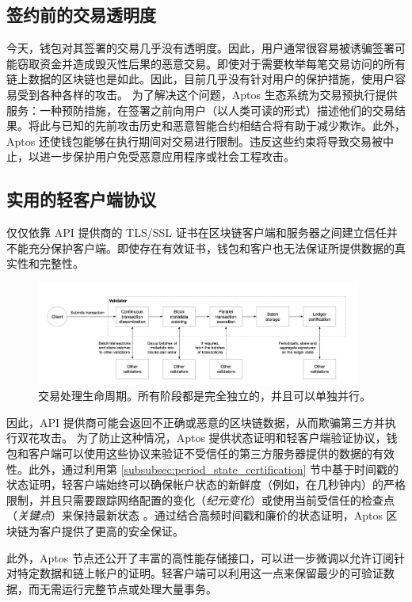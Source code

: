 \documentclass{article}
\begin{document}
\subsection{签约前的交易透明度}

今天，钱包对其签署的交易几乎没有透明度。因此，用户通常很容易被诱骗签署可能窃取资金并造成毁灭性后果的恶意交易。即使对于需要枚举每笔交易访问的所有链上数据的区块链也是如此。因此，目前几乎没有针对用户的保护措施，使用户容易受到各种各样的攻击。 为了解决这个问题，Aptos 生态系统为交易预执行提供服务：一种预防措施，在签署之前向用户（以人类可读的形式）描述他们的交易结果。将此与已知的先前攻击历史和恶意智能合约相结合将有助于减少欺诈。此外，Aptos 还使钱包能够在执行期间对交易进行限制。违反这些约束将导致交易被中止，以进一步保护用户免受恶意应用程序或社会工程攻击。

\subsection{实用的轻客户端协议}

仅仅依靠 API 提供商的 TLS/SSL 证书在区块链客户端和服务器之间建立信任并不能充分保护客户端。即使存在有效证书，钱包和客户也无法保证所提供数据的真实性和完整性。

\begin{figure}
\centering
\includegraphics[width=0.95\textwidth]{pipeline.png}
\caption{\label{fig:pipeline}交易处理生命周期。所有阶段都是完全独立的，并且可以单独并行。}
\end{figure}

因此，API 提供商可能会返回不正确或恶意的区块链数据，从而欺骗第三方并执行双花攻击。 为了防止这种情况，Aptos 提供状态证明和轻客户端验证协议，钱包和客户端可以使用这些协议来验证不受信任的第三方服务器提供的数据的有效性。此外，通过利用第 \ref{subsubsec:period_state_certification} 节中基于时间戳的状态证明，轻客户端始终可以确保帐户状态的新鲜度（例如，在几秒钟内）的严格限制，并且只需要跟踪网络配置的变化（\emph{纪元变化}）或使用当前受信任的检查点（\emph{关键点}）来保持最新状态 \cite{waypoints}。通过结合高频时间戳和廉价的状态证明，Aptos 区块链为客户提供了更高的安全保证。 

此外，Aptos 节点还公开了丰富的高性能存储接口，可以进一步微调以允许订阅针对特定数据和链上帐户的证明。轻客户端可以利用这一点来保留最少的可验证数据，而无需运行完整节点或处理大量事务。
\end{document}
